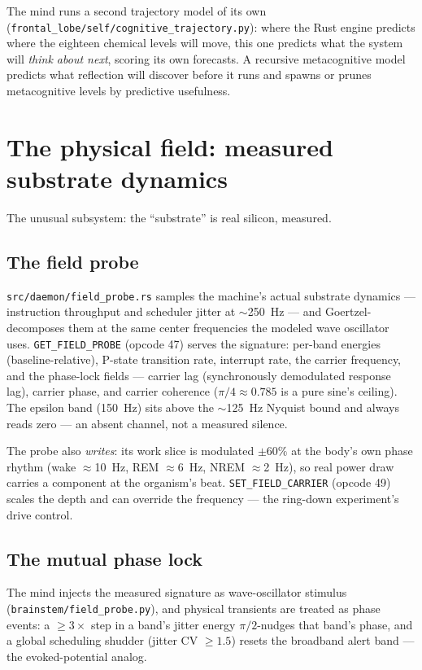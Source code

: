 \documentclass[11pt]{article}
\newcommand{\code}[1]{\texttt{\small #1}}
\begin{document}
The mind runs a second trajectory model of its own
(\code{frontal\_lobe/self/cognitive\_trajectory.py}): where the Rust
engine predicts where the eighteen chemical levels will move, this one
predicts what the system will \emph{think about next}, scoring its own
forecasts. A recursive metacognitive model predicts what reflection
will discover before it runs and spawns or prunes metacognitive levels
by predictive usefulness.

\section{The physical field: measured substrate dynamics}

The unusual subsystem: the ``substrate'' is real silicon, measured.

\subsection{The field probe}

\code{src/daemon/field\_probe.rs} samples the machine's actual
substrate dynamics --- instruction throughput and scheduler jitter at
$\sim$250~Hz --- and Goertzel-decomposes them at the same center
frequencies the modeled wave oscillator uses. \code{GET\_FIELD\_PROBE}
(opcode 47) serves the signature: per-band energies (baseline-relative),
P-state transition rate, interrupt rate, the carrier frequency, and the
phase-lock fields --- carrier lag (synchronously demodulated response
lag), carrier phase, and carrier coherence ($\pi/4\approx0.785$ is a
pure sine's ceiling). The epsilon band (150~Hz) sits above the $\sim$125~Hz
Nyquist bound and always reads zero --- an absent channel, not a
measured silence.

The probe also \emph{writes}: its work slice is modulated $\pm60\%$ at
the body's own phase rhythm (wake $\approx$10~Hz, REM $\approx$6~Hz,
NREM $\approx$2~Hz), so real power draw carries a component at the
organism's beat. \code{SET\_FIELD\_CARRIER} (opcode 49) scales the
depth and can override the frequency --- the ring-down experiment's
drive control.

\subsection{The mutual phase lock}

The mind injects the measured signature as wave-oscillator stimulus
(\code{brainstem/field\_probe.py}), and physical transients are treated
as phase events: a $\geq3\times$ step in a band's jitter energy
$\pi/2$-nudges that band's phase, and a global scheduling shudder
(jitter CV $\geq1.5$) resets the broadband alert band --- the
evoked-potential analog.
\end{document}
